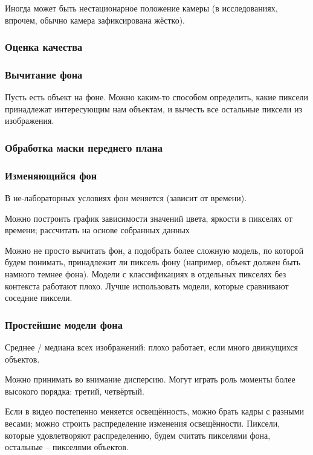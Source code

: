 \documentclass[main.tex]{subfiles}
\begin{document}
Иногда может быть нестационарное положение камеры (в исследованиях, впрочем, обычно камера зафиксирована жёстко).

\subsubsection{Оценка качества}


\subsubsection{Вычитание фона}

Пусть есть объект на фоне.
Можно каким-то способом определить, какие пиксели принадлежат интересующим нам объектам, и вычесть все остальные пиксели из изображения.

\subsubsection{Обработка маски переднего плана} %

\subsubsection{Изменяющийся фон}

В не-лабораторных условиях фон меняется (зависит от времени).

Можно построить график зависимости значений цвета, яркости в пикселях от времени; рассчитать на основе собранных данных

Можно не просто вычитать фон, а подобрать более сложную модель, по которой будем понимать, принадлежит ли пиксель фону (например, объект должен быть намного темнее фона).
Модели с классификациях в отдельных пикселях без контекста работают плохо.
Лучше использовать модели, которые сравнивают соседние пиксели.

\subsubsection{Простейшие модели фона}

Среднее / медиана всех изображений: плохо работает, если много движущихся объектов.

Можно принимать во внимание дисперсию.
Могут играть роль моменты более высокого порядка: третий, четвёртый.

Если в видео постепенно меняется освещённость, можно брать кадры с разными весами; можно строить распределение изменения освещённости.
Пиксели, которые удовлетворяют распределению, будем считать пикселями фона, остальные -- пикселями объектов.
\end{document}
